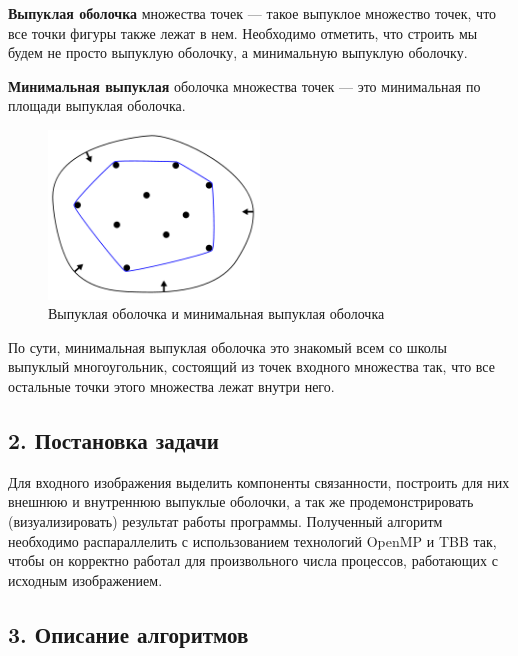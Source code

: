 \documentclass{report}
\begin{document}
\par \textbf{Выпуклая оболочка} множества точек — такое выпуклое множество точек, что все точки фигуры также лежат в нем. Необходимо отметить, что строить мы будем не просто выпуклую оболочку, а минимальную выпуклую оболочку.
\par \textbf{Минимальная выпуклая} оболочка множества точек — это минимальная по площади выпуклая оболочка.
\begin{figure}[htbp]
  \centering
  \includegraphics[width=0.5\textwidth]{2. Convex Hull}
  \caption{Выпуклая оболочка и минимальная выпуклая оболочка}\label{fig:2. Convex Hull}
\end{figure}
\par По сути, минимальная выпуклая оболочка это знакомый всем со школы выпуклый многоугольник, состоящий из точек входного множества так, что все остальные точки этого множества лежат внутри него.
 
\newpage


\begin{center}
\section*{2. Постановка задачи}
\end{center}
\par Для входного изображения выделить компоненты связанности, построить для них внешнюю и внутреннюю выпуклые оболочки, а так же продемонстрировать (визуализировать) результат работы программы. Полученный алгоритм необходимо распараллелить с использованием технологий OpenMP и TBB так, чтобы он корректно работал для произвольного числа процессов, работающих с исходным изображением.

\newpage


\begin{center}
\section*{3. Описание алгоритмов}
\end{center}
\end{document}
